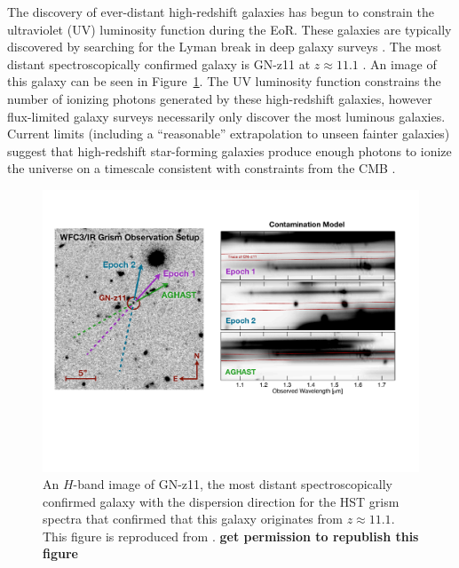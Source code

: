 \begin{bibunit}
The discovery of ever-distant high-redshift galaxies has begun to constrain the ultraviolet (UV)
luminosity function during the EoR. These galaxies are typically discovered by searching for the
Lyman break in deep galaxy surveys \citep[pioneered by][]{1996ApJ...462L..17S}.  The most distant
spectroscopically confirmed galaxy is GN-z11 at $z\approx 11.1$ \citep{2016ApJ...819..129O}. An
image of this galaxy can be seen in Figure~\ref{fig:oesch-galaxy}.  The UV luminosity function
constrains the number of ionizing photons generated by these high-redshift galaxies, however
flux-limited galaxy surveys necessarily only discover the most luminous galaxies. Current limits
(including a ``reasonable'' extrapolation to unseen fainter galaxies) suggest that high-redshift
star-forming galaxies produce enough photons to ionize the universe on a timescale consistent with
constraints from the CMB \citep{2015ApJ...802L..19R}.

\begin{figure}[t]
    \centering
    \includegraphics[width=\textwidth]{figures/chapter1/oesch-gn-z11}
    \caption{
        An $H$-band image of GN-z11, the most distant spectroscopically confirmed galaxy with the
        dispersion direction for the HST grism spectra that confirmed that this galaxy originates
        from $z\approx11.1$. This figure is reproduced from \citet{2016ApJ...819..129O}. \textbf{get
        permission to republish this figure}
    }
    \label{fig:oesch-galaxy}
\end{figure}


\end{bibunit}
